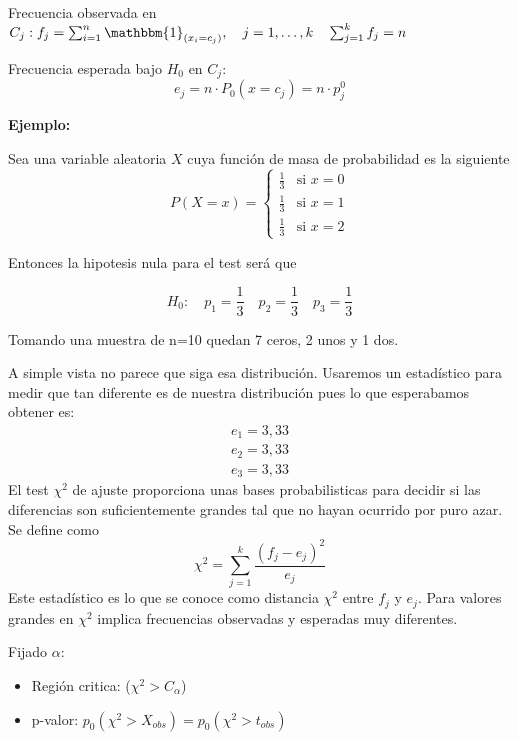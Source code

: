 Frecuencia observada en $C_j: f_j=\sum_{i=1}^{n} \mathbbm{1}_{(x_i=c_j)}, \quad j=1,\dots,k \quad \sum_{j=1}^{k} f_j=n$

Frecuencia esperada bajo $H_0$ en $C_j$:
\[
    e_j=n \cdot P_0(x=c_j)=n \cdot p_j^0
\]

\newpage

\textbf{Ejemplo:}

Sea una variable aleatoria $X$ cuya función de masa de probabilidad es la siguiente
\[
    P(X = x) = 
    \left\{
        \begin{matrix}
            \frac{1}{3} & \text{si } x = 0 \\[0.5em]
            \frac{1}{3} & \text{si } x = 1 \\[0.5em]
            \frac{1}{3} & \text{si } x = 2
        \end{matrix}
    \right.
\]

Entonces la hipotesis nula para el test será que

\[
    H_0:\quad p_1=\frac{1}{3} \quad p_2=\frac{1}{3} \quad p_3=\frac{1}{3}
\]

Tomando una muestra de n=10 quedan 7 ceros, 2 unos y 1 dos.

\vspace{5mm}

A simple vista no parece que siga esa distribución. Usaremos un estadístico para medir que tan diferente es de nuestra distribución pues lo que esperabamos obtener es:
\[
    \begin{matrix}
        e_1=3,33\\
        e_2=3,33\\
        e_3=3,33
    \end{matrix}
\]
El test $\chi^2$ de ajuste proporciona unas bases probabilisticas para decidir si las diferencias son suficientemente grandes tal que no hayan ocurrido por puro azar. Se define como
\[
    \chi^2=\sum_{j=1}^{k} \frac{(f_j-e_j)^2}{e_j}
\]
Este estadístico es lo que se conoce como distancia $\chi^2$ entre $f_j$ y $e_j$. Para valores grandes en $\chi^2$ implica frecuencias observadas y esperadas muy diferentes. 

\vspace{5mm}

\noindent Fijado $\alpha$:
\begin{itemize}
    \item Región critica: ($\chi^2 > C_\alpha$)
    \item p-valor: $p_0(\chi^2>X_{obs})=p_0(\chi^2>t_{obs})$
\end{itemize}

